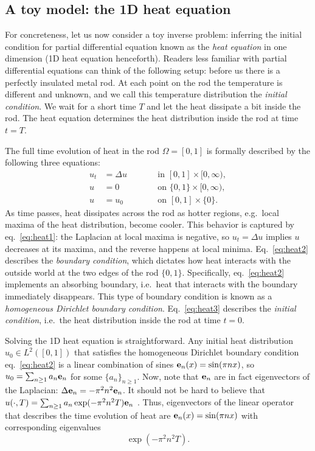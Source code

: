 \subsection{A toy model: the 1D heat equation}\label{subsec:toy}
For concreteness, let us now consider a toy inverse problem: inferring
the initial condition for partial differential equation known as the
\emph{heat equation} in one dimension (1D heat equation
henceforth). Readers less familiar with partial differential equations
can think of the following setup: before us there is a perfectly
insulated metal rod. At each point on the rod the temperature is
different and unknown, and we call this temperature distribution the
\emph{initial condition}. We wait for a short time $T$ and let the
heat dissipate a bit inside the rod. The heat equation determines the
heat distribution inside the rod at time $t=T$.

The full time evolution of heat in the rod $\Omega=[0,1]$ is formally
described by the following three equations:
\begin{subequations}
  \begin{alignat}{2}
    u_t &= \Delta u &&\qquad \text{in } [0,1] \times [0,\infty), \label{eq:heat1}\\
    u &= 0 &&\qquad \text{on } \{0, 1\} \times [0,\infty), \label{eq:heat2}\\
    u &= u_0 &&\qquad \text{on }[0,1] \times \{0\}. \label{eq:heat3}
  \end{alignat}
\end{subequations}
As time passes, heat dissipates across the rod as hotter regions,
e.g.~local maxima of the heat distribution, become cooler. This
behavior is captured by eq.~\eqref{eq:heat1}: the Laplacian at local
maxima is negative, so $u_t = \Delta u$ implies $u$ decreases at its
maxima, and the reverse happens at local minima. Eq.~\eqref{eq:heat2}
describes the \emph{boundary condition}, which dictates how heat
interacts with the outside world at the two edges of the rod
$\{0,1\}$. Specifically, eq.~\eqref{eq:heat2} implements an absorbing
boundary, i.e.~heat that interacts with the boundary immediately
disappears. This type of boundary condition is known as a
\emph{homogeneous Dirichlet boundary condition}. Eq.~\eqref{eq:heat3}
describes the \emph{initial condition}, i.e.~the heat distribution
inside the rod at time $t=0$.

Solving the 1D heat equation is straightforward. Any initial heat
distribution $u_0\in L^2([0,1])$ that satisfies the homogeneous
Dirichlet boundary condition eq.~\eqref{eq:heat2} is a linear
combination of sines $\mathbf{e}_n(x) = \sin(\pi n x)$, so $u_0 = \sum_{n\geq
  1} a_n \mathbf{e}_n$ for some $\{a_n\}_{n\geq 1}$. Now, note that $\mathbf{e}_n$
are in fact eigenvectors of the Laplacian: $\Delta \mathbf{e}_n = -\pi^2
n^2\mathbf{e}_n$. It should not be hard to believe that $u(\cdot, T) =
\sum_{n\geq 1} a_n \exp(-\pi^2 n^2T ) \mathbf{e}_n$
\cite{renardy2006PDE}. Thus, eigenvectors of the linear operator that
describes the time evolution of heat are $\mathbf{e}_n(x) = \sin(\pi n x)$
with corresponding eigenvalues
\begin{equation}\label{eq:decay}
  \exp(-\pi^2 n^2T ).
\end{equation}

